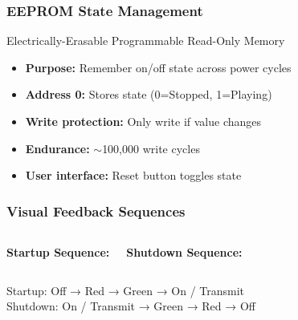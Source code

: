 \documentclass[aspectratio=169, 8pt]{beamer}
\begin{document}
	\begin{frame}[fragile,shrink=10]
		\frametitle{EEPROM State Management}
		Electrically-Erasable Programmable Read-Only Memory
		
		\vspace{0.3cm}
		
		
		\begin{itemize}
			\item \textbf{Purpose:} Remember on/off state across power cycles
			\item \textbf{Address 0:} Stores state (0=Stopped, 1=Playing)
			\item \textbf{Write protection:} Only write if value changes
			\item \textbf{Endurance:} $\sim$100,000 write cycles
			\item \textbf{User interface:} Reset button toggles state
		\end{itemize}
	\end{frame}
	
	\begin{frame}[fragile,shrink=10]
		\frametitle{Visual Feedback Sequences}
		\vspace{0.5cm}
		\begin{columns}
			\textbf{Startup Sequence:}
			
			
			\textbf{Shutdown Sequence:}
			
		\end{columns}
		
		\vspace{0.3cm}
		\begin{center}
			Startup: Off → Red → Green → On / Transmit\\
			Shutdown: On / Transmit → Green → Red → Off
		\end{center}
	\end{frame}
	
\end{document}
